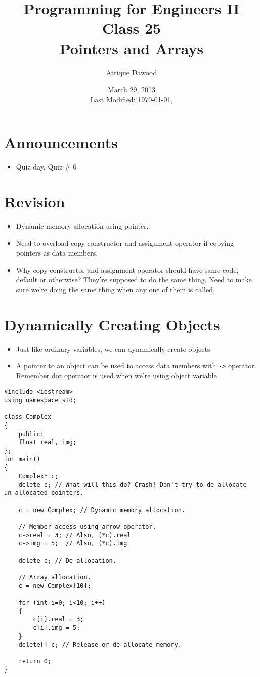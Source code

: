 \documentclass[12pt,a4paper]{article}
\title{\vspace{-2cm}Programming for Engineers II\\Class 25\\Pointers and Arrays}
\author{Attique Dawood}
\date{March 29, 2013\\[0.2cm] Last Modified: \today, \currenttime}
\begin{document}
\maketitle
\section{Announcements}
\begin{itemize}
\item Quiz day. Quiz \# 6
\end{itemize}
\section{Revision}
\begin{itemize}
\item Dynamic memory allocation using pointer.
\item Need to overload copy constructor and assignment operator if copying pointers as data members.
\item Why copy constructor and assignment operator should have same code, default or otherwise? They're supposed to do the same thing. Need to make sure we're doing the same thing when any one of them is called.
\end{itemize}
\section{Dynamically Creating Objects}
\begin{itemize}
\item Just like ordinary variables, we can dynamically create objects.
\item A pointer to an object can be used to access data members with \verb|->| operator. Remember dot operator is used when we're using object variable.
\end{itemize}
\begin{lstlisting}[caption={Pointers to Objects}]
#include <iostream>
using namespace std;

class Complex
{
	public:
	float real, img;
};
int main()
{
	Complex* c;
	delete c; // What will this do? Crash! Don't try to de-allocate un-allocated pointers.

	c = new Complex; // Dynamic memory allocation.

	// Member access using arrow operator.
	c->real = 3; // Also, (*c).real
	c->img = 5;  // Also, (*c).img

	delete c; // De-allocation.

	// Array allocation.
	c = new Complex[10];

	for (int i=0; i<10; i++)
	{
		c[i].real = 3;
		c[i].img = 5;
	}
	delete[] c; // Release or de-allocate memory.

	return 0;
}
\end{lstlisting}
\end{document}
